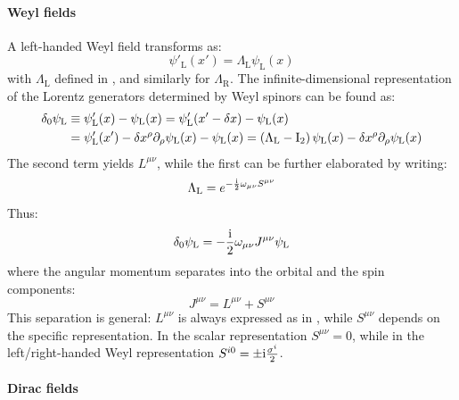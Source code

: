 \paragraph{Weyl fields}

A left-handed Weyl field transforms as:
\begin{equation}
  \psi'_\text{L}(x') = \Lambda_\text{L} \psi_\text{L}(x)
\end{equation}
with $ \Lambda_\text{L} $ defined in , and similarly for $ \Lambda_\text{R} $. The infinite-dimensional representation of the Lorentz generators determined by Weyl spinors can be found as:
\begin{equation*}
  \begin{split}
    \delta_0 \psi_\text{L}
    &\equiv \psi'_\text{L}(x) - \psi_\text{L}(x) = \psi'_\text{L}(x' - \delta x) - \psi_\text{L}(x) \\
    &= \psi'_\text{L}(x') - \delta x^\rho \partial_\rho \psi_\text{L}(x) - \psi_\text{L}(x) = \left( \Lambda_\text{L} - \mathrm{I}_2 \right) \psi_\text{L}(x) - \delta x^\rho \partial_\rho \psi_\text{L}(x)
  \end{split}
\end{equation*}
The second term yields $ L^{\mu \nu} $, while the first can be further elaborated by writing:
\begin{equation}
  \Lambda_\text{L} = e^{-\frac{\mathrm{i}}{2} \omega_{\mu \nu} S^{\mu \nu}}
\end{equation}
Thus:
\begin{equation*}
  \delta_0 \psi_\text{L} = - \frac{\mathrm{i}}{2} \omega_{\mu \nu} J^{\mu \nu} \psi_\text{L}
\end{equation*}
where the angular momentum separates into the orbital and the spin components:
\begin{equation}
  J^{\mu \nu} = L^{\mu \nu} + S^{\mu \nu}
\end{equation}
This separation is general: $ L^{\mu \nu} $ is always expressed as in , while $ S^{\mu \nu} $ depends on the specific representation. In the scalar representation $ S^{\mu \nu} = 0 $, while in the left/right-handed Weyl representation $ S^{i0} = \pm \mathrm{i} \frac{\sigma^i}{2} $.

\paragraph{Dirac fields}

